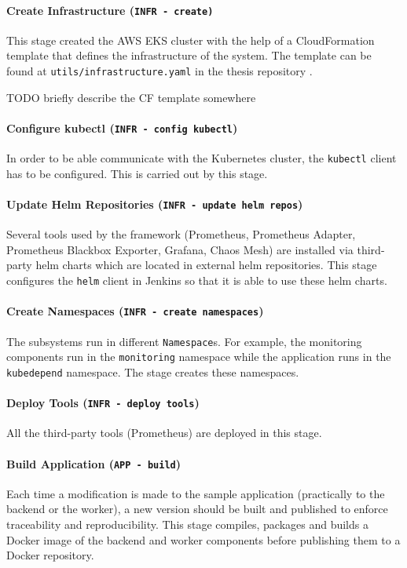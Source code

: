 \paragraph{Create Infrastructure (\texttt{INFR - create)}} This stage created the AWS EKS cluster with the help of a CloudFormation template that defines the infrastructure of the system. The template can be found at \texttt{utils/infrastructure.yaml} in the thesis repository \cite{ThesisRepo}.


TODO briefly describe the CF template somewhere


\paragraph{Configure kubectl (\texttt{INFR - config kubectl})} In order to be able communicate with the Kubernetes cluster, the \texttt{kubectl} client has to be configured. This is carried out by this stage.

\paragraph{Update Helm Repositories (\texttt{INFR - update helm repos})} Several tools used by the framework (Prometheus, Prometheus Adapter, Prometheus Blackbox Exporter, Grafana, Chaos Mesh) are installed via third-party helm charts which are located in external helm repositories. This stage configures the \texttt{helm} client in Jenkins so that it is able to use these helm charts.

\paragraph{Create Namespaces (\texttt{INFR - create namespaces})} The subsystems run in different \texttt{Namespace}s. For example, the monitoring components run in the \texttt{monitoring} namespace while the application runs in the \texttt{kubedepend} namespace. The stage creates these namespaces.

\paragraph{Deploy Tools (\texttt{INFR - deploy tools})} All the third-party tools (\eg Prometheus) are deployed in this stage.

\paragraph{Build Application (\texttt{APP - build})} Each time a modification is made to the sample application (practically to the backend or the worker), a new version should be built and published to enforce traceability and reproducibility. This stage compiles, packages and builds a Docker image of the backend and worker components before publishing them to a Docker repository.

